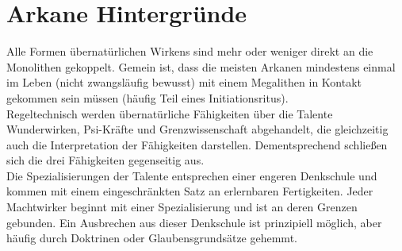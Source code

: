 \documentclass[10pt,a4paper]{report}
\begin{document}
\section{Arkane Hintergründe}
Alle Formen übernatürlichen Wirkens sind mehr oder weniger direkt an die Monolithen gekoppelt. Gemein ist, dass die meisten Arkanen mindestens einmal im Leben (nicht zwangsläufig bewusst) mit einem Megalithen in Kontakt gekommen sein müssen (häufig Teil eines Initiationsritus).\\ Regeltechnisch werden übernatürliche Fähigkeiten über die Talente Wunderwirken, Psi-Kräfte und Grenzwissenschaft abgehandelt, die gleichzeitig auch die Interpretation der Fähigkeiten darstellen. Dementsprechend schließen sich die drei Fähigkeiten gegenseitig aus.\\
Die Spezialisierungen der Talente entsprechen einer engeren Denkschule und kommen mit einem eingeschränkten Satz an erlernbaren Fertigkeiten. Jeder Machtwirker beginnt mit einer Spezialisierung und ist an deren Grenzen gebunden. Ein Ausbrechen aus dieser Denkschule ist prinzipiell möglich, aber häufig durch Doktrinen oder Glaubensgrundsätze gehemmt.
\end{document}

